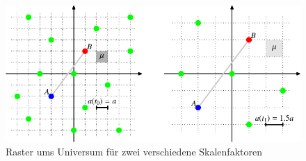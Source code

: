 \begin{refsection}
\begin{figure}
	\centering
	\includegraphics{friedmann/images/friedmann-1.pdf}
	\caption{Raster ums Universum für zwei verschiedene Skalenfaktoren}
	\label{friedmann:friedmannRaster}
\end{figure}%

\end{refsection}
